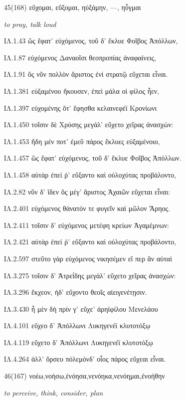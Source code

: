 \begin{enumerate}
{ΙΛ.6.74 Ἴλιον εἰσανέβησαν ἀναλκείῃσι δαμέντες,
}

\clearpage
\item[\large 45(168)]{\large \g εὔχομαι, εὔξομαι, ηὐξάμην, —, ηὖγμαι }

\hspace{0.2cm} \textit{ to pray, talk loud  }

{\g
ΙΛ.1.43 ὣς ἔφατ' εὐχόμενος, τοῦ δ' ἔκλυε Φοῖβος Ἀπόλλων,

ΙΛ.1.87 εὐχόμενος Δαναοῖσι θεοπροπίας ἀναφαίνεις,

ΙΛ.1.91 ὃς νῦν πολλὸν ἄριστος ἐνὶ στρατῷ εὔχεται εἶναι.

ΙΛ.1.381 εὐξαμένου ἤκουσεν, ἐπεὶ μάλα οἱ φίλος ἦεν,

ΙΛ.1.397 εὐχομένης ὅτ' ἔφησθα κελαινεφέϊ Κρονίωνι

ΙΛ.1.450 τοῖσιν δὲ Χρύσης μεγάλ' εὔχετο χεῖρας ἀνασχών:

ΙΛ.1.453 ἤδη μέν ποτ' ἐμεῦ πάρος ἔκλυες εὐξαμένοιο,

ΙΛ.1.457 ὣς ἔφατ' εὐχόμενος, τοῦ δ' ἔκλυε Φοῖβος Ἀπόλλων.

ΙΛ.1.458 αὐτὰρ ἐπεί ῥ' εὔξαντο καὶ οὐλοχύτας προβάλοντο,

ΙΛ.2.82 νῦν δ' ἴδεν ὃς μέγ' ἄριστος Ἀχαιῶν εὔχεται εἶναι:

ΙΛ.2.401 εὐχόμενος θάνατόν τε φυγεῖν καὶ μῶλον Ἄρηος.

ΙΛ.2.411 τοῖσιν δ' εὐχόμενος μετέφη κρείων Ἀγαμέμνων:

ΙΛ.2.421 αὐτὰρ ἐπεί ῥ' εὔξαντο καὶ οὐλοχύτας προβάλοντο,

ΙΛ.2.597 στεῦτο γὰρ εὐχόμενος νικησέμεν εἴ περ ἂν αὐταὶ

ΙΛ.3.275 τοῖσιν δ' Ἀτρεΐδης μεγάλ' εὔχετο χεῖρας ἀνασχών:

ΙΛ.3.296 ἔκχεον, ἠδ' εὔχοντο θεοῖς αἰειγενέτῃσιν.

ΙΛ.3.430 ἦ μὲν δὴ πρίν γ' εὔχε' ἀρηϊφίλου Μενελάου

ΙΛ.4.101 εὔχεο δ' Ἀπόλλωνι Λυκηγενέϊ κλυτοτόξῳ

ΙΛ.4.119 εὔχετο δ' Ἀπόλλωνι Λυκηγενέϊ κλυτοτόξῳ

ΙΛ.4.264 ἀλλ' ὄρσευ πόλεμόνδ' οἷος πάρος εὔχεαι εἶναι.
}

\clearpage
\item[\large 46(167)]{\large \g νοέω,νοήσω,ἐνόησα,νενόηκα,νενόημαι,ἐνοήθην}  

\hspace{0.2cm} \textit{ to perceive, think, consider, plan  }


\end{enumerate}
